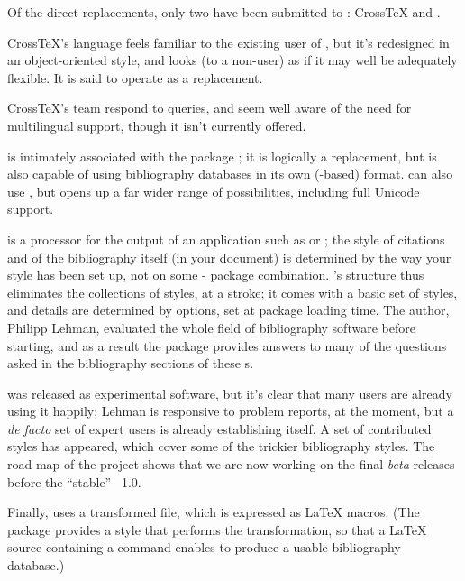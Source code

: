 Of the direct \BibTeX{} replacements, only two have been submitted to
: Cross\TeX{} and .

Cross\TeX{}'s language feels familiar to the existing user of
\BibTeX{}, but it's redesigned in an object-oriented style, and looks
(to a non-user) as if it may well be adequately flexible.  It is said
to operate as a \bibtex{} replacement.

Cross\TeX{}'s team respond to queries, and seem well aware of the
need for multilingual support, though it isn't currently offered.

 is intimately associated with the \latex{} package
; it is logically a \bibtex{} replacement, but is also
capable of using bibliography databases in its own
 (-based) format.  
can also use \bibtex{}, but  opens up a far wider
range of possibilities, including full Unicode support.

 is a processor for the output of an application
such as  or \bibtex{}; the style of citations and of
the bibliography itself (in your document) is determined by the way
your  style has been set up, not on some
\bibtex{}-\latex{} package combination.  's
structure thus eliminates the collections of \BibTeX{} styles, at a
stroke; it comes with a basic set of styles, and details are
determined by options, set at package loading time.  The author,
Philipp Lehman, evaluated the whole field of bibliography software
before starting, and as a result the package provides answers to
many of the questions asked in the bibliography sections of these
s.

 was released as experimental software, but it's
clear that many users are already using it happily; Lehman is
responsive to problem reports, at the moment, but a \emph{de facto}
set of expert users is already establishing itself.  A set of
contributed styles has appeared, which cover some of the trickier
bibliography styles.  The road map of the project shows that we are
now working on the final \emph{beta} releases before the ``stable''
~1.0.

Finally,  uses a transformed  file,
which is expressed as \LaTeX{} macros.  (The package provides a
\BibTeX{} style that performs the transformation, so that a \LaTeX{}
source containing a  command enables \BibTeX{} to
produce a usable  bibliography database.)

